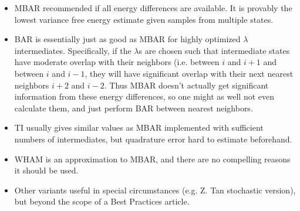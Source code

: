 \documentclass[9pt,bestpractices]{livecoms}
\begin{document}
\begin{enumerate}
\begin{itemize}
\item MBAR recommended if all energy differences are available. It is provably the lowest variance free energy estimate given samples from multiple states.
\item BAR is essentially just as good as MBAR for highly optimized $\lambda$ intermediates.  Specifically, if the $\lambda$s are chosen such that intermediate states have moderate overlap with their neighbors (i.e. between $i$ and $i+1$ and between $i$ and $i-1$, they will  have significant overlap with their next nearest neighbors $i+2$ and $i-2$. Thus MBAR doesn't actually get significant information from these energy differences, so one might as well not even calculate them, and just perform BAR between nearest neighbors.~\cite{paliwal.benchmark} 
\item TI usually gives similar values as MBAR implemented with sufficient numbers of intermediates, but quadrature error hard to estimate beforehand.~\cite{paliwal.benchmark}
\item WHAM is an approximation to MBAR, and there are no compelling reasons it should be used. 
\item Other variants useful in special circumstances (e.g. Z. Tan stochastic version), but beyond the scope of a Best Practices article.
\end{itemize}

\end{enumerate}
\end{document}
